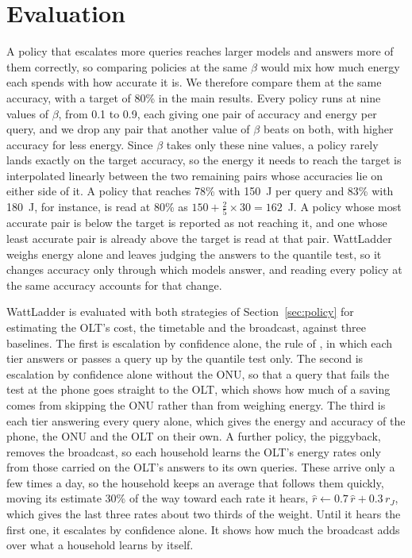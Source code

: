 \documentclass[cic,dipl,english]{infufrgs}
\begin{document}
\section{Evaluation}
\label{sec:evaluation}

A policy that escalates more queries reaches larger models and answers more of them
correctly, so comparing policies at the same $\beta$ would mix how much energy each spends
with how accurate it is. We therefore compare them at the same accuracy, with a target of
80\% in the main results. Every policy runs at
nine values of $\beta$, from 0.1 to 0.9, each giving one pair of accuracy and energy per
query, and we drop any pair that another value of $\beta$ beats on both, with higher
accuracy for less energy. Since $\beta$ takes only these nine values, a policy rarely lands
exactly on the target accuracy, so the energy it needs to reach the target is interpolated
linearly between the two remaining pairs whose accuracies lie on either side of it. A policy
that reaches 78\% with 150~J per query and 83\% with 180~J, for instance, is read at 80\% as
$150 + \frac{2}{5} \times 30 = 162$~J. A policy whose most accurate pair is below the target is reported as not
reaching it, and one whose least accurate pair is already above the target is read at that
pair. WattLadder weighs energy alone and leaves judging the
answers to the quantile test, so it changes accuracy only through which models answer, and
reading every policy at the same accuracy accounts for that change.

WattLadder is evaluated with both strategies of Section~\ref{sec:policy} for estimating the
OLT's cost, the timetable and the broadcast, against three baselines. The first is
escalation by confidence alone, the rule of , in which each tier
answers or passes a query up by the quantile test only. The second is escalation by confidence
alone without the ONU, so that a query that fails the test at the phone goes straight to the
OLT, which shows how much of a
saving comes from skipping the ONU rather than from weighing energy. The third is each tier
answering every query alone, which gives the energy and accuracy of the phone, the ONU and
the OLT on their own. A further policy, the piggyback, removes the broadcast, so each
household learns the OLT's energy rates only from those carried on the OLT's answers to its own
queries. These arrive only a few times a day, so the household keeps an average that follows
them quickly, moving its estimate 30\% of the way toward each rate it hears,
$\hat{r} \leftarrow 0.7\,\hat{r} + 0.3\,r_J$, which gives the last three rates about two thirds
of the weight. Until it hears the first one, it escalates by confidence alone. It shows how much the broadcast
adds over what a household learns by itself.
\end{document}
